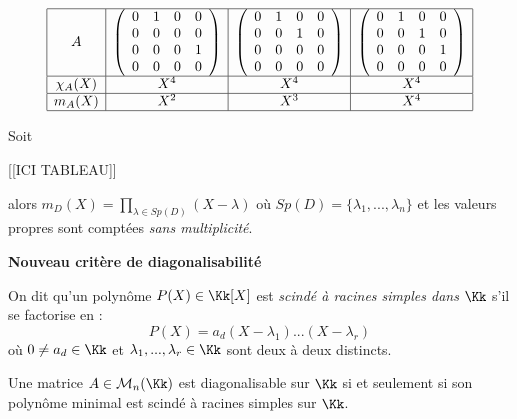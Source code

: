 \documentclass[class=report,crop=false]{standalone}
\newcommand{\Sp}{Sp}
\begin{document}
\begin{exercicecours}
\[
\begin{array}{|c|c|c|c|}
\hline
A & \left(\begin{array}{cccc}
0&1&0&0\\
0&0&0&0\\
0&0&0&1\\
0&0&0&0
\end{array}\right) & \left(\begin{array}{cccc}
0&1&0&0\\
0&0&1&0\\
0&0&0&0\\
0&0&0&0
\end{array}\right) & \left(\begin{array}{cccc}
0&1&0&0\\
0&0&1&0\\
0&0&0&1\\
0&0&0&0
\end{array}\right) \\\hline
\chi_A(X) & X^4 & X^4 & X^4\\\hline
m_A(X)&X^2&X^3& X^4\\\hline
\end{array}\]
\end{exercicecours}

\begin{exercicecours}
Soit 

[[ICI TABLEAU]]


alors $m_D(X) = \prod_{\lambda \in \Sp(D)}(X-\lambda)$ où $\Sp(D) = \{\lambda_1,...,\lambda_n\}$ et les valeurs propres sont comptées {\it sans multiplicité}.

\end{exercicecours}
{\bf Nouveau critère de diagonalisabilité}

On dit qu'un polynôme $P(X) \in \Kk[X]$ est {\it scindé à racines simples dans $\Kk$} s'il se factorise en :
\[P(X) = a_d (X-\lambda_1)...(X-\lambda_r)\]
où $0 \neq a_d \in \Kk$ et $\lambda_1,...,\lambda_r\in\Kk$ sont deux à deux distincts. 

\begin{theoreme}
Une matrice $A \in \mathcal{M}_n(\Kk)$ est diagonalisable sur $\Kk$ si et seulement si son polynôme minimal est scindé à racines simples sur $\Kk$.
\end{theoreme}
\end{document}
